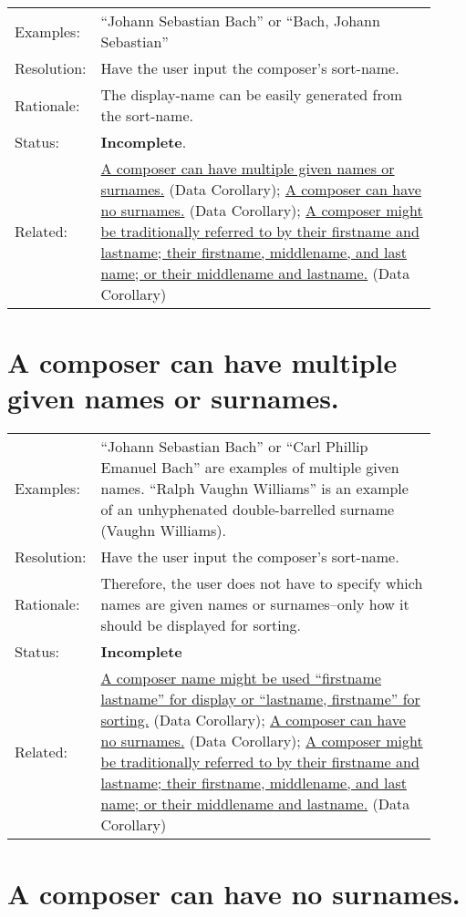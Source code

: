 \documentclass[letterpaper]{report}
\begin{document}
\begin{tabular}{ p{0.1\linewidth} p{0.825\linewidth} }
  Examples: & ``Johann Sebastian Bach'' or ``Bach, Johann Sebastian'' \\ 
  Resolution: & Have the user input the composer's sort-name. \\
  Rationale: & The display-name can be easily generated from the sort-name. \\
  Status: & \textbf{Incomplete}. \\
  Related: & \hyperref[D.9]{A composer can have multiple given names or surnames.} (Data Corollary); \hyperref[D.10]{A composer can have no surnames.} (Data Corollary); \hyperref[D.11]{A composer might be traditionally referred to by their firstname and lastname; their firstname, middlename, and last name; or their middlename and lastname.} (Data Corollary)
\end{tabular}

\section{A composer can have multiple given names or surnames.}
\label{D.9}

\begin{tabular}{ p{0.1\linewidth} p{0.825\linewidth} }
  Examples: & ``Johann Sebastian Bach'' or ``Carl Phillip Emanuel Bach'' are examples of multiple given names. ``Ralph Vaughn Williams'' is an example of an unhyphenated double-barrelled surname (Vaughn Williams).  \\ 
  Resolution: & Have the user input the composer's sort-name. \\
  Rationale: & Therefore, the user does not have to specify which names are given names or surnames--only how it should be displayed for sorting. \\
  Status: & \textbf{Incomplete} \\
  Related: & \hyperref[D.8]{A composer name might be used ``firstname lastname'' for display or ``lastname, firstname'' for sorting.} (Data Corollary); \hyperref[D.10]{A composer can have no surnames.} (Data Corollary); \hyperref[D.11]{A composer might be traditionally referred to by their firstname and lastname; their firstname, middlename, and last name; or their middlename and lastname.} (Data Corollary) \\
\end{tabular}

\section{A composer can have no surnames.}
\label{D.10}
\end{document}
